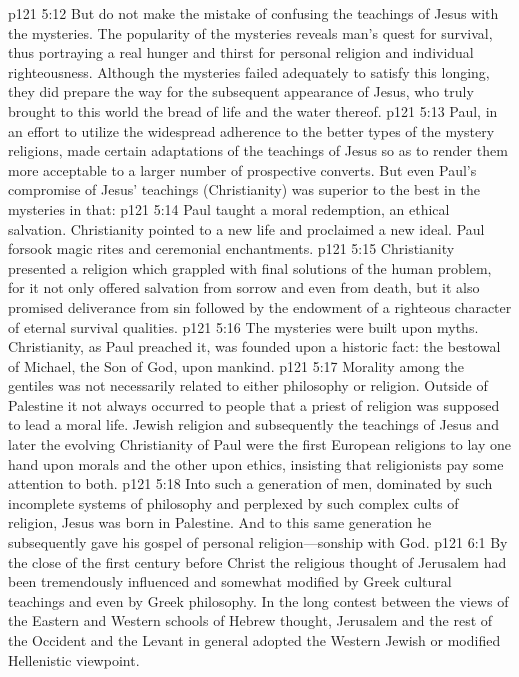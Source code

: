 \pc \vs p121 5:12 But do not make the mistake of confusing the teachings of Jesus with the mysteries. The popularity of the mysteries reveals man’s quest for survival, thus portraying a real hunger and thirst for personal religion and individual righteousness. Although the mysteries failed adequately to satisfy this longing, they did prepare the way for the subsequent appearance of Jesus, who truly brought to this world the bread of life and the water thereof.
\vs p121 5:13 Paul, in an effort to utilize the widespread adherence to the better types of the mystery religions, made certain adaptations of the teachings of Jesus so as to render them more acceptable to a larger number of prospective converts. But even Paul’s compromise of Jesus’ teachings (Christianity) was superior to the best in the mysteries in that:
\pc \vs p121 5:14 \bibnobreakspace Paul taught a moral redemption, an ethical salvation. Christianity pointed to a new life and proclaimed a new ideal. Paul forsook magic rites and ceremonial enchantments.
\pc \vs p121 5:15 \bibnobreakspace Christianity presented a religion which grappled with final solutions of the human problem, for it not only offered salvation from sorrow and even from death, but it also promised deliverance from sin followed by the endowment of a righteous character of eternal survival qualities.
\pc \vs p121 5:16 \bibnobreakspace The mysteries were built upon myths. Christianity, as Paul preached it, was founded upon a historic fact: the bestowal of Michael, the Son of God, upon mankind.
\pc \vs p121 5:17 Morality among the gentiles was not necessarily related to either philosophy or religion. Outside of Palestine it not always occurred to people that a priest of religion was supposed to lead a moral life. Jewish religion and subsequently the teachings of Jesus and later the evolving Christianity of Paul were the first European religions to lay one hand upon morals and the other upon ethics, insisting that religionists pay some attention to both.
\vs p121 5:18 Into such a generation of men, dominated by such incomplete systems of philosophy and perplexed by such complex cults of religion, Jesus was born in Palestine. And to this same generation he subsequently gave his gospel of personal religion---sonship with God.
\vs p121 6:1 By the close of the first century before Christ the religious thought of Jerusalem had been tremendously influenced and somewhat modified by Greek cultural teachings and even by Greek philosophy. In the long contest between the views of the Eastern and Western schools of Hebrew thought, Jerusalem and the rest of the Occident and the Levant in general adopted the Western Jewish or modified Hellenistic viewpoint.
